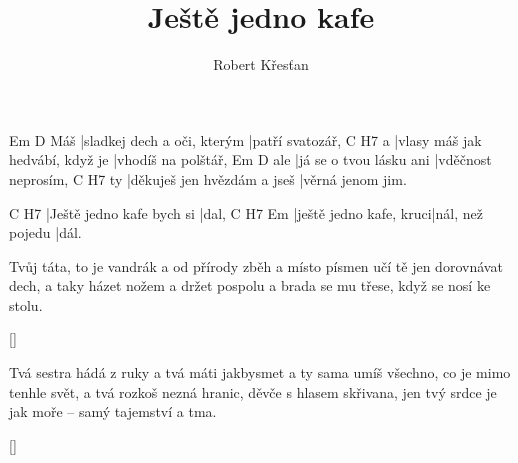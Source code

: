 \documentclass{song}
\title{Ještě jedno kafe}
\author{Robert Křesťan}
\begin{document}
\strophe
    Em                          D
Máš |sladkej dech a oči, kterým |patří svatozář,
  C                               H7
a |vlasy máš jak hedvábí, když je |vhodíš na polštář,
    Em                      D
ale |já se o tvou lásku ani |vděčnost neprosím,
   C                           H7
ty |děkuješ jen hvězdám a jseš |věrná jenom jim.
\endstrophe

C                         H7
|Ještě jedno kafe bych si |dal,
C                       H7               Em
|ještě jedno kafe, kruci|nál, než pojedu |dál.
\endstrophe

\strophe*
Tvůj táta, to je vandrák a od přírody zběh
a místo písmen učí tě jen dorovnávat dech,
a taky házet nožem a držet pospolu
a brada se mu třese, když se nosí ke stolu.
\endstrophe

\ref{}

\strophe*
Tvá sestra hádá z ruky a tvá máti jakbysmet
a ty sama umíš všechno, co je mimo tenhle svět,
a tvá rozkoš nezná hranic, děvče s hlasem skřivana,
jen tvý srdce je jak moře -- samý tajemství a tma.
\endstrophe

\ref{}
\end{document}
